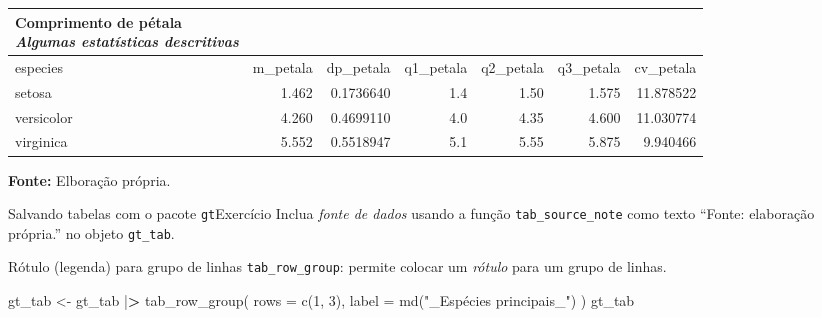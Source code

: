 \documentclass[
  10pt,
  ignorenonframetext,
]{beamer}
\newenvironment{Shaded}{}{}
\newcommand{\DataTypeTok}[1]{#1}
\newcommand{\DecValTok}[1]{#1}
\newcommand{\ErrorTok}[1]{\textcolor[rgb]{1.00,0.00,0.00}{\textbf{#1}}}
\newcommand{\KeywordTok}[1]{\textcolor[rgb]{0.00,0.00,1.00}{#1}}
\newcommand{\NormalTok}[1]{#1}
\newcommand{\OperatorTok}[1]{#1}
\newcommand{\StringTok}[1]{\textcolor[rgb]{0.00,0.50,0.50}{#1}}
\begin{document}
\begin{frame}
\scriptsize

\setlength{\LTpost}{0mm}
\begin{longtable}{lrrrrrr}
\caption*{
{\large \textbf{Comprimento de pétala}} \\ 
{\small \emph{Algumas estatísticas descritivas}}
} \\ 
\toprule
especies & m\_petala & dp\_petala & q1\_petala & q2\_petala & q3\_petala & cv\_petala \\ 
\midrule
setosa & 1.462 & 0.1736640 & 1.4 & 1.50 & 1.575 & 11.878522 \\ 
versicolor & 4.260 & 0.4699110 & 4.0 & 4.35 & 4.600 & 11.030774 \\ 
virginica & 5.552 & 0.5518947 & 5.1 & 5.55 & 5.875 & 9.940466 \\ 
\bottomrule
\end{longtable}
\begin{minipage}{\linewidth}
\textbf{Fonte:} Elboração própria.\\
\end{minipage}

\normalsize
\end{frame}

\begin{frame}[fragile]{Salvando tabelas com o pacote
\texttt{gt}\newline Exercício}
\protect\hypertarget{salvando-tabelas-com-o-pacote-gtexercuxedcio-1}{}
Inclua \emph{fonte de dados} usando a função \texttt{tab\_source\_note}
como texto ``Fonte: elaboração própria.'' no objeto \texttt{gt\_tab}.
\end{frame}

\begin{frame}[fragile]{Rótulo (legenda) para grupo de linhas}
\protect\hypertarget{ruxf3tulo-legenda-para-grupo-de-linhas}{}
\texttt{tab\_row\_group}: permite colocar um \emph{rótulo} para um grupo
de linhas.

\begin{Shaded}
\begin{Highlighting}[]
\NormalTok{gt\_tab \textless{}{-}}\StringTok{ }\NormalTok{gt\_tab }\OperatorTok{|}\ErrorTok{\textgreater{}}
\StringTok{  }\KeywordTok{tab\_row\_group}\NormalTok{(}
    \DataTypeTok{rows =} \KeywordTok{c}\NormalTok{(}\DecValTok{1}\NormalTok{, }\DecValTok{3}\NormalTok{),}
    \DataTypeTok{label =} \KeywordTok{md}\NormalTok{(}\StringTok{"\_Espécies principais\_"}\NormalTok{)}
\NormalTok{  )}
\NormalTok{gt\_tab}
\end{Highlighting}
\end{Shaded}
\end{frame}
\end{document}
